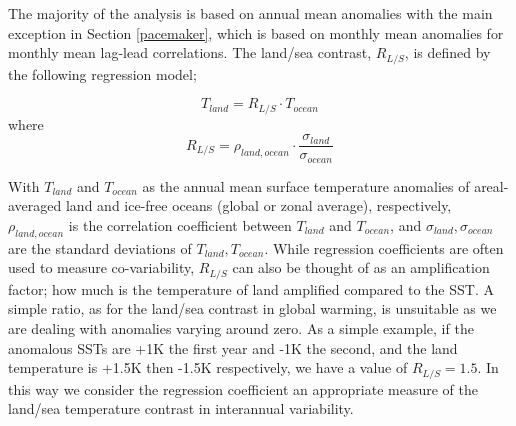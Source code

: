 The majority of the analysis is based on annual mean anomalies with the main 
exception in Section \ref{pacemaker}, which is based on monthly mean anomalies 
for monthly mean lag-lead correlations. The land/sea contrast, $R_{L/S}$, is 
defined by the following regression model;

\begin{equation}
T_{land} = R_{L/S} \cdot T_{ocean}
\end{equation}
where
\begin{equation}
	R_{L/S} = \rho_{land,ocean}\cdot \frac{\sigma_{land}}{\sigma_{ocean}}
\end{equation}

With $T_{land}$ and $T_{ocean}$ as the annual mean surface temperature anomalies 
of areal-averaged land and ice-free oceans (global or zonal average), 
respectively, $\rho_{land,ocean}$ is the correlation coefficient between 
$T_{land}$ and $T_{ocean}$, and $\sigma_{land}, \sigma_{ocean}$ are the standard 
deviations of $T_{land}, T_{ocean}$. While regression coefficients are often 
used to measure co-variability, $R_{L/S}$ can also be thought of as an 
amplification factor; how much is the temperature of land amplified compared to 
the SST. A simple ratio, as for the land/sea contrast in global warming, is 
unsuitable as we are dealing with anomalies varying around zero. As a simple 
example, if the anomalous SSTs are +1K the first year and -1K the second, and 
the land temperature is +1.5K then -1.5K respectively, we have a value of 
$R_{L/S} = 1.5$. In this way we consider the regression coefficient an 
appropriate measure of the land/sea temperature contrast in interannual 
variability.
